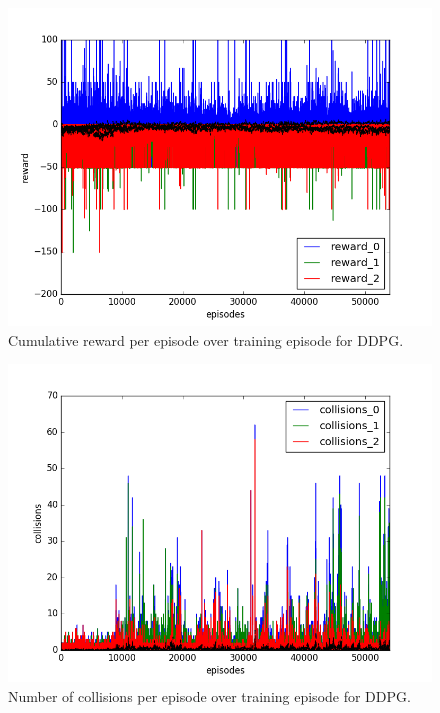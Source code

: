 \begin{figure}[h]
  \centering
  \includegraphics[trim=10 10 10 10,clip,width=\figscale\linewidth]
  {../results/ddpg_2vs1/reward.png}
  \caption{Cumulative reward per episode over training episode for DDPG.}
  \label{fig:ddpg-2vs1}
\end{figure}
\FloatBarrier


\begin{figure}[h]
  \centering
  \includegraphics[trim=10 10 10 10,clip,width=\figscale\linewidth]
  {../results/ddpg_2vs1/collisions.png}
  \caption{Number of collisions per episode over training episode for DDPG.}
  \label{fig:ddpg-2vs1}
\end{figure}
\FloatBarrier


